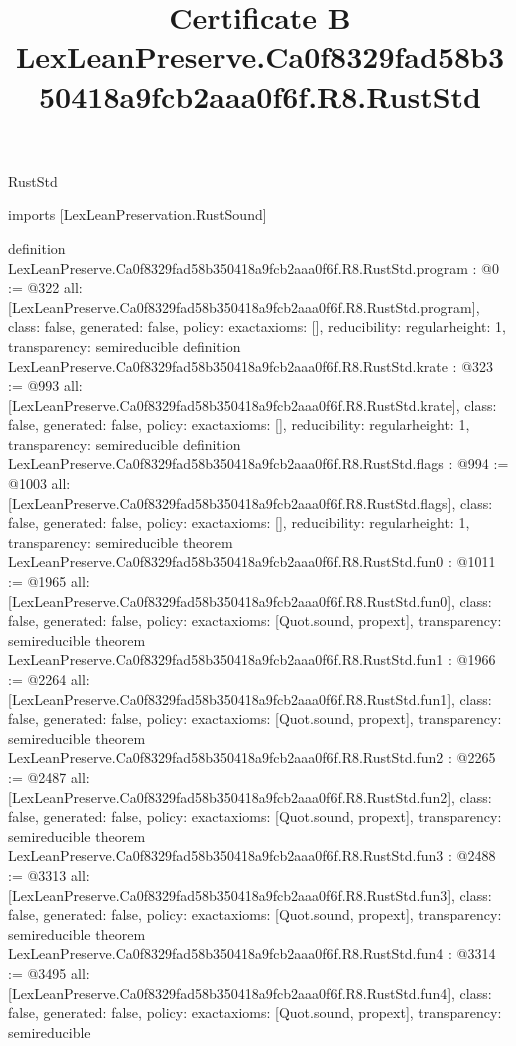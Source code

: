 \begin{lexlean}{RustStd}
\title{Certificate B LexLeanPreserve.Ca0f8329fad58b350418a9fcb2aaa0f6f.R8.RustStd}
\begin{coremodule}
imports [LexLeanPreservation.RustSound]

definition LexLeanPreserve.Ca0f8329fad58b350418a9fcb2aaa0f6f.R8.RustStd.program : @0 := @322 {
  all: [LexLeanPreserve.Ca0f8329fad58b350418a9fcb2aaa0f6f.R8.RustStd.program],
  class: false,
  generated: false,
  policy: exact{axioms: []},
  reducibility: regular{height: 1},
  transparency: semireducible
}
definition LexLeanPreserve.Ca0f8329fad58b350418a9fcb2aaa0f6f.R8.RustStd.krate : @323 := @993 {
  all: [LexLeanPreserve.Ca0f8329fad58b350418a9fcb2aaa0f6f.R8.RustStd.krate],
  class: false,
  generated: false,
  policy: exact{axioms: []},
  reducibility: regular{height: 1},
  transparency: semireducible
}
definition LexLeanPreserve.Ca0f8329fad58b350418a9fcb2aaa0f6f.R8.RustStd.flags : @994 := @1003 {
  all: [LexLeanPreserve.Ca0f8329fad58b350418a9fcb2aaa0f6f.R8.RustStd.flags],
  class: false,
  generated: false,
  policy: exact{axioms: []},
  reducibility: regular{height: 1},
  transparency: semireducible
}
theorem LexLeanPreserve.Ca0f8329fad58b350418a9fcb2aaa0f6f.R8.RustStd.fun0 : @1011 := @1965 {
  all: [LexLeanPreserve.Ca0f8329fad58b350418a9fcb2aaa0f6f.R8.RustStd.fun0],
  class: false,
  generated: false,
  policy: exact{axioms: [Quot.sound, propext]},
  transparency: semireducible
}
theorem LexLeanPreserve.Ca0f8329fad58b350418a9fcb2aaa0f6f.R8.RustStd.fun1 : @1966 := @2264 {
  all: [LexLeanPreserve.Ca0f8329fad58b350418a9fcb2aaa0f6f.R8.RustStd.fun1],
  class: false,
  generated: false,
  policy: exact{axioms: [Quot.sound, propext]},
  transparency: semireducible
}
theorem LexLeanPreserve.Ca0f8329fad58b350418a9fcb2aaa0f6f.R8.RustStd.fun2 : @2265 := @2487 {
  all: [LexLeanPreserve.Ca0f8329fad58b350418a9fcb2aaa0f6f.R8.RustStd.fun2],
  class: false,
  generated: false,
  policy: exact{axioms: [Quot.sound, propext]},
  transparency: semireducible
}
theorem LexLeanPreserve.Ca0f8329fad58b350418a9fcb2aaa0f6f.R8.RustStd.fun3 : @2488 := @3313 {
  all: [LexLeanPreserve.Ca0f8329fad58b350418a9fcb2aaa0f6f.R8.RustStd.fun3],
  class: false,
  generated: false,
  policy: exact{axioms: [Quot.sound, propext]},
  transparency: semireducible
}
theorem LexLeanPreserve.Ca0f8329fad58b350418a9fcb2aaa0f6f.R8.RustStd.fun4 : @3314 := @3495 {
  all: [LexLeanPreserve.Ca0f8329fad58b350418a9fcb2aaa0f6f.R8.RustStd.fun4],
  class: false,
  generated: false,
  policy: exact{axioms: [Quot.sound, propext]},
  transparency: semireducible
}
\end{coremodule}
\end{lexlean}
